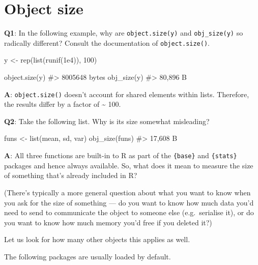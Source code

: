 \documentclass[
]{krantz}
\makeatletter
\newenvironment{Shaded}{\begin{snugshade}}{\end{snugshade}}
\newcommand{\CommentTok}[1]{\textcolor[rgb]{0.56,0.35,0.01}{\textit{#1}}}
\newcommand{\DecValTok}[1]{\textcolor[rgb]{0.00,0.00,0.81}{#1}}
\newcommand{\FloatTok}[1]{\textcolor[rgb]{0.00,0.00,0.81}{#1}}
\newcommand{\KeywordTok}[1]{\textcolor[rgb]{0.13,0.29,0.53}{\textbf{#1}}}
\newcommand{\NormalTok}[1]{#1}
\newcommand{\StringTok}[1]{\textcolor[rgb]{0.31,0.60,0.02}{#1}}
\newenvironment{kframe}{%
\medskip{}
\setlength{\fboxsep}{.8em}
 \def\at@end@of@kframe{}%
 \ifinner\ifhmode%
  \def\at@end@of@kframe{\end{minipage}}%
  \begin{minipage}{\columnwidth}%
 \fi\fi%
 \def\FrameCommand##1{\hskip\@totalleftmargin \hskip-\fboxsep
 \colorbox{shadecolor}{##1}\hskip-\fboxsep
     \hskip-\linewidth \hskip-\@totalleftmargin \hskip\columnwidth}%
 \MakeFramed {\advance\hsize-\width
   \@totalleftmargin\z@ \linewidth\hsize
   \@setminipage}}%
 {\par\unskip\endMakeFramed%
 \at@end@of@kframe}
\renewenvironment{Shaded}{\begin{kframe}}{\end{kframe}}
\renewcommand{\KeywordTok} [1]{\textcolor[rgb]{0.00,0.44,0.13}{{#1}}}
\renewcommand{\DecValTok}  [1]{\textcolor[rgb]{0.25,0.63,0.44}{{#1}}}
\renewcommand{\FloatTok}   [1]{\textcolor[rgb]{0.25,0.63,0.44}{{#1}}}
\renewcommand{\StringTok}  [1]{\textcolor[rgb]{0.25,0.44,0.63}{{#1}}}
\renewcommand{\CommentTok} [1]{\textcolor[rgb]{0.38,0.63,0.69}{{#1}}}
\renewcommand{\NormalTok}  [1]{{#1}}
\makeatother
\begin{document}
\hypertarget{object-size}{%
\section{Object size}\label{object-size}}

\textbf{{Q1}}: In the following example, why are \texttt{object.size(y)} and \texttt{obj\_size(y)} so radically different? Consult the documentation of \texttt{object.size()}.

\begin{Shaded}
\begin{Highlighting}[]
\NormalTok{y <-}\StringTok{ }\KeywordTok{rep}\NormalTok{(}\KeywordTok{list}\NormalTok{(}\KeywordTok{runif}\NormalTok{(}\FloatTok{1e4}\NormalTok{)), }\DecValTok{100}\NormalTok{)}

\KeywordTok{object.size}\NormalTok{(y)}
\CommentTok{#> 8005648 bytes}
\KeywordTok{obj_size}\NormalTok{(y)}
\CommentTok{#> 80,896 B}
\end{Highlighting}
\end{Shaded}

\textbf{{A}}: \texttt{object.size()} doesn't account for shared elements within lists. Therefore, the results differ by a factor of \textasciitilde{} 100.

\textbf{{Q2}}: Take the following list. Why is its size somewhat misleading?

\begin{Shaded}
\begin{Highlighting}[]
\NormalTok{funs <-}\StringTok{ }\KeywordTok{list}\NormalTok{(mean, sd, var)}
\KeywordTok{obj_size}\NormalTok{(funs)}
\CommentTok{#> 17,608 B}
\end{Highlighting}
\end{Shaded}

\textbf{{A}}: All three functions are built-in to R as part of the \texttt{\{base\}} and \texttt{\{stats\}} packages and hence always available. So, what does it mean to measure the size of something that's already included in R?

(There's typically a more general question about what you want to know when you ask for the size of something --- do you want to know how much data you'd need to send to communicate the object to someone else (e.g.~serialise it), or do you want to know how much memory you'd free if you deleted it?)

Let us look for how many other objects this applies as well.

The following packages are usually loaded by default.
\end{document}
